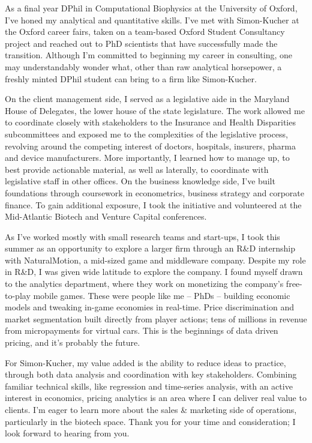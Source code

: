 \documentclass{../res}
\begin{document}
\begin{sloppypar}
\begin{resume}
As a final year DPhil in Computational Biophysics at the University of Oxford, I've honed my analytical and quantitative skills. I've met with Simon-Kucher at the Oxford career fairs, taken on a team-based Oxford Student Consultancy project and reached out to PhD scientists that have successfully made the transition. Although I'm committed to beginning my career in consulting, one may understandably wonder what, other than raw analytical horsepower, a freshly minted DPhil student can bring to a firm like Simon-Kucher.

On the client management side, I served as a legislative aide in the Maryland House of Delegates, the lower house of the state legislature. The work allowed me to coordinate closely with stakeholders to the Insurance and Health Disparities subcommittees and exposed me to the complexities of the legislative process, revolving around the competing interest of doctors, hospitals, insurers, pharma and device manufacturers. More importantly, I learned how to manage up, to best provide actionable material, as well as laterally, to coordinate with legislative staff in other offices. On the business knowledge side, I've built foundations through coursework in econometrics, business strategy and corporate finance. To gain additional exposure, I took the initiative and volunteered at the Mid-Atlantic Biotech and Venture Capital conferences.

As I've worked mostly with small research teams and start-ups, I took this summer as an opportunity to explore a larger firm through an R\&D internship with NaturalMotion, a mid-sized game and middleware company. Despite my role in R\&D, I was given wide latitude to explore the company. I found myself drawn to the analytics department, where they work on monetizing the company's free-to-play mobile games. These were people like me -- PhDs -- building economic models and tweaking in-game economies in real-time. Price discrimination and market segmentation built directly from player actions; tens of millions in revenue from micropayments for virtual cars. This is the beginnings of data driven pricing, and it's probably the future. 

For Simon-Kucher, my value added is the ability to reduce ideas to practice, through both data analysis and coordination with key stakeholders. Combining familiar technical skills, like regression and time-series analysis, with an active interest in economics, pricing analytics is an area where I can deliver real value to clients. I'm eager to learn more about the sales \& marketing side of operations, particularly in the biotech space. Thank you for your time and consideration; I look forward to hearing from you.


\end{resume}
\end{sloppypar}
\end{document}
